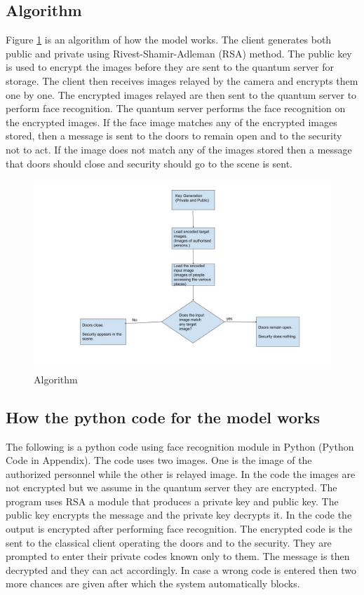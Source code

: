 \subsection{Algorithm}  
Figure \ref{fig3 : algorithm} is an algorithm of how the model works.
The client generates both public and private using Rivest-Shamir-Adleman (RSA) method. The public key is used to encrypt the images before they are sent to the quantum server for storage. The client then receives images relayed by the camera and encrypts them one by one. The encrypted images relayed are then sent to the quantum server to perform face recognition. The quantum server performs the face recognition on the encrypted images. If the face image matches any of the encrypted images stored, then a message is sent to the doors to remain open and to the security not to act. If the image does not match any of the images stored then a message that doors should close and security should go to the scene is sent. 
\begin{figure}[!h]
\includegraphics[scale=0.375]{images/Algorithm.jpg} 
\caption{Algorithm}
\label{fig3 : algorithm}
\end{figure}
\newpage
\subsection{How the python code for the model works}
The following is a python code using face recognition module in Python (Python Code in Appendix). The code uses two images. One is the image of the authorized personnel while the other is relayed image. In the code the images are not encrypted but we assume in the quantum server they are encrypted. The program uses RSA a module that produces a private key and public key. The public key encrypts the message and the private key decrypts it. In the code the output is encrypted after performing face recognition. The encrypted code is the sent to the classical client operating the doors and to the security. They are prompted to enter their private codes known only to them. The message is then decrypted and they can act accordingly. In case a wrong code is entered then two more chances are given after which the system automatically blocks.

